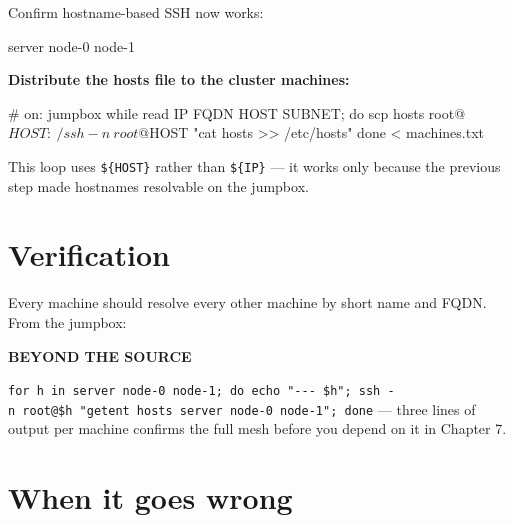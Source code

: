 \documentclass[11pt,oneside]{report}
\newcommand{\calloutlabel}[2]{{\sffamily\bfseries\footnotesize\color{#1}#2\quad}}
\begin{document}
Confirm
hostname-based SSH
now works:


\begin{outlst}
server
node-0
node-1
\end{outlst}

\textbf{Distribute
the hosts file to
the cluster
machines:}

\begin{cmdlst}
# on: jumpbox
while read IP FQDN HOST SUBNET; do
  scp hosts root@${HOST}:~/
  ssh -n \
    root@${HOST} "cat hosts >> /etc/hosts"
done < machines.txt
\end{cmdlst}

This loop uses
\texttt{\$\{HOST\}}
rather than
\texttt{\$\{IP\}}
--- it works only
because the previous
step made hostnames
resolvable on the
jumpbox.

\hypertarget{verification-2}{%
\section{Verification}\label{verification-2}}

Every machine should
resolve every other
machine by short
name and FQDN. From
the jumpbox:

\begin{beyondbox}\calloutlabel{teal}{BEYOND THE SOURCE}

\texttt{for\ h\ in\ server\ node-}\allowbreak{}\texttt{0\ node-}\allowbreak{}\texttt{1;\ do\ echo\ "-\/-\/-\ \$h";\ ssh\ -}\allowbreak{}\texttt{n\ root@\$h\ "getent\ hosts\ server\ node-}\allowbreak{}\texttt{0\ node-}\allowbreak{}\texttt{1";\ done}
--- three lines of
output per machine
confirms the full
mesh before you
depend on it in
Chapter 7.

\end{beyondbox}

\hypertarget{when-it-goes-wrong-2}{%
\section{When it
goes
wrong}\label{when-it-goes-wrong-2}}
\end{document}
